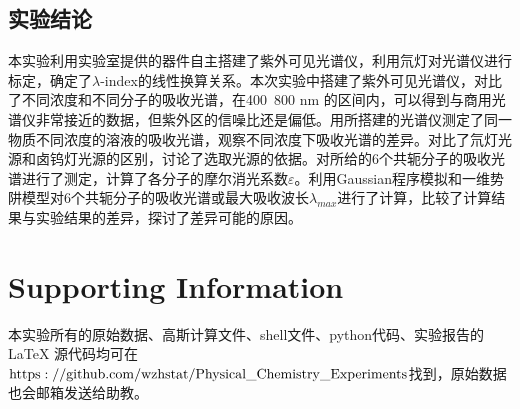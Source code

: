 \documentclass[12pt]{article}
\begin{document}
				  \subsection{实验结论}
			本实验利用实验室提供的器件自主搭建了紫外可见光谱仪，利用氘灯对光谱仪进行标定，确定了$\lambda$-index的线性换算关系。本次实验中搭建了紫外可见光谱仪，对比了不同浓度和不同分子的吸收光谱，在400~800 nm 的区间内，可以得到与商用光谱仪非常接近的数据，但紫外区的信噪比还是偏低。用所搭建的光谱仪测定了同一物质不同浓度的溶液的吸收光谱，观察不同浓度下吸收光谱的差异。对比了氘灯光源和卤钨灯光源的区别，讨论了选取光源的依据。对所给的6个共轭分子的吸收光谱进行了测定，计算了各分子的摩尔消光系数$\varepsilon$。利用Gaussian程序模拟和一维势阱模型对6个共轭分子的吸收光谱或最大吸收波长$\lambda_{max}$进行了计算，比较了计算结果与实验结果的差异，探讨了差异可能的原因。
			 
	\vbox{}
	\section{Supporting Information}
		本实验所有的原始数据、高斯计算文件、shell文件、python代码、实验报告的 LaTeX 源代码均可在 $\rm{https://github.com/wzhstat/Physical\_Chemistry\_Experiments}$找到，原始数据也会邮箱发送给助教。
\vbox{}  


\end{document}
